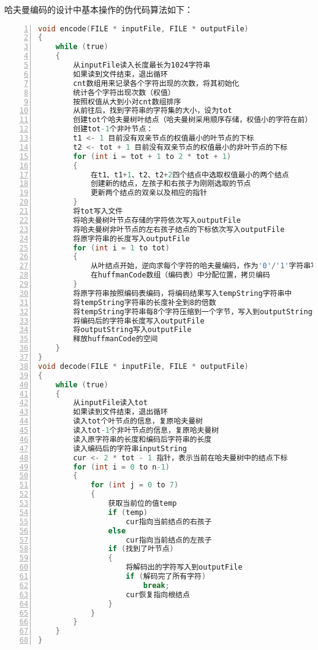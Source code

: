 \documentclass{article}
\begin{document}
哈夫曼编码的设计中基本操作的伪代码算法如下：

\begin{lstlisting}[language={C},
    numbers=left,
    numberstyle=\tiny\consolas,
    basicstyle=\small\consolas]
void encode(FILE * inputFile, FILE * outputFile)
{
    while (true)
    {
        从inputFile读入长度最长为1024字符串
        如果读到文件结束，退出循环
        cnt数组用来记录各个字符出现的次数，将其初始化
        统计各个字符出现次数（权值）
        按照权值从大到小对cnt数组排序
        从前往后，找到字符串的字符集的大小，设为tot
        创建tot个哈夫曼树叶结点（哈夫曼树采用顺序存储，权值小的字符在前）
        创建tot-1个非叶节点：
        t1 <- 1 目前没有双亲节点的权值最小的叶节点的下标
        t2 <- tot + 1 目前没有双亲节点的权值最小的非叶节点的下标
        for (int i = tot + 1 to 2 * tot + 1)
        {
            在t1、t1+1、t2、t2+2四个结点中选取权值最小的两个结点
            创建新的结点，左孩子和右孩子为刚刚选取的节点
            更新两个结点的双亲以及相应的指针
        }
        将tot写入文件
        将哈夫曼树叶节点存储的字符依次写入outputFile
        将哈夫曼树非叶节点的左右孩子结点的下标依次写入outputFile
        将原字符串的长度写入outputFile
        for (int i = 1 to tot)
        {
            从叶结点开始，逆向求每个字符的哈夫曼编码，作为'0'/'1'字符串写入tempString
            在huffmanCode数组（编码表）中分配位置，拷贝编码
        }
        将原字符串按照编码表编码，将编码结果写入tempString字符串中
        将tempString字符串的长度补全到8的倍数
        将tempString字符串每8个字符压缩到一个字节，写入到outputString中
        将编码后的字符串长度写入outputFile
        将outputString写入outputFile
        释放huffmanCode的空间
    }
}
void decode(FILE * inputFile, FILE * outputFile)
{
    while (true)
    {
        从inputFile读入tot
        如果读到文件结束，退出循环
        读入tot个叶节点的信息，复原哈夫曼树
        读入tot-1个非叶节点的信息，复原哈夫曼树
        读入原字符串的长度和编码后字符串的长度
        读入编码后的字符串inputString
        cur <- 2 * tot - 1 指针，表示当前在哈夫曼树中的结点下标
        for (int i = 0 to n-1)
        {
            for (int j = 0 to 7)
            {
                获取当前位的值temp
                if (temp)
                    cur指向当前结点的右孩子
                else
                    cur指向当前结点的左孩子
                if (找到了叶节点)
                {
                    将解码出的字符写入到outputFile
                    if (解码完了所有字符)
                        break;
                    cur恢复指向根结点
                }
            }
        }
    }
}
\end{lstlisting}
\end{document}
